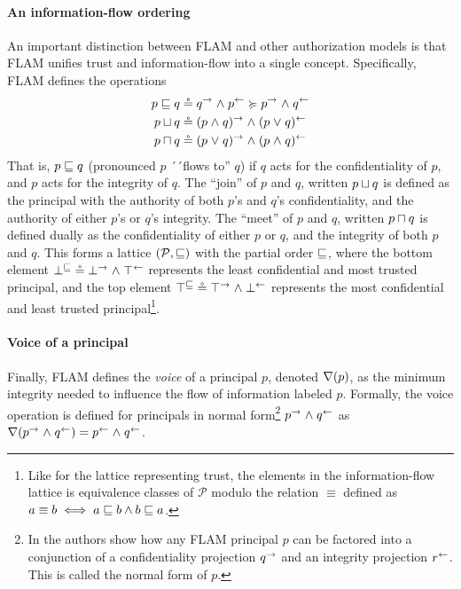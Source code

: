 \paragraph{An information-flow ordering}
An important distinction between FLAM and other authorization models is that FLAM unifies trust and information-flow into a single concept. Specifically, FLAM defines the operations
\begin{align*}
p \sqsubseteq q &\circeq q^{\rightarrow} \mathrel{\land} p^{\leftarrow} \succcurlyeq p^{\rightarrow} \mathrel{\land} q^{\leftarrow}\\
p \sqcup q &\circeq (p \mathrel{\land} q)^{\rightarrow} \mathrel{\land} (p \mathrel{\lor} q)^{\leftarrow} \\
p \sqcap q &\circeq (p \mathrel{\lor} q)^{\rightarrow} \mathrel{\land} (p \mathrel{\land} q)^{\leftarrow}
\end{align*}
That is, $p \sqsubseteq q$ (pronounced $p$ ´´flows to'' $q$) if $q$ acts for the confidentiality of $p$, and $p$ acts for the integrity of $q$. The ``join'' of $p$ and $q$, written $p \sqcup q$ is defined as the principal with the authority of both $p$'s and $q$'s confidentiality, and the authority of either $p$'s or $q$'s integrity. The ``meet'' of $p$ and $q$, written $p \sqcap q$ is defined dually as the confidentiality of either $p$ or $q$, and the integrity of both $p$ and $q$.
This forms a lattice $(\mathcal{P}, \sqsubseteq)$ with the partial order $\sqsubseteq$, where the bottom element $\bot^{\sqsubseteq} \circeq \bot^{\rightarrow} \mathrel{\land} \top^{\leftarrow}$ represents the least confidential and most trusted principal, and the top element $\top^{\sqsubseteq} \circeq \top^{\rightarrow} \mathrel{\land} \bot^{\leftarrow}$ represents the most confidential and least trusted principal\footnote{Like for the lattice representing trust, the elements in the information-flow lattice is equivalence classes of $\mathcal{P}$ modulo the relation $\equiv$ defined as $a \equiv b \iff a \sqsubseteq b \wedge b \sqsubseteq a$.}.

\paragraph{Voice of a principal}
Finally, FLAM defines the \emph{voice} of a principal $p$, denoted $\nabla(p)$, as the minimum integrity needed to influence the flow of information labeled $p$. Formally, the voice operation is defined for principals in normal form\footnote{In \cite{Arden:2015:FA:2859845.2859998} the authors show how any FLAM principal $p$ can be factored into a conjunction of a confidentiality projection $q^{\rightarrow}$ and an integrity projection $r^{\leftarrow}$. This is called the normal form of $p$.} $p^{\rightarrow} \mathrel{\land} q^{\leftarrow}$ as $\nabla(p^{\rightarrow} \mathrel{\land} q^{\leftarrow}) = p^{\leftarrow} \mathrel{\land} q^{\leftarrow}$.

